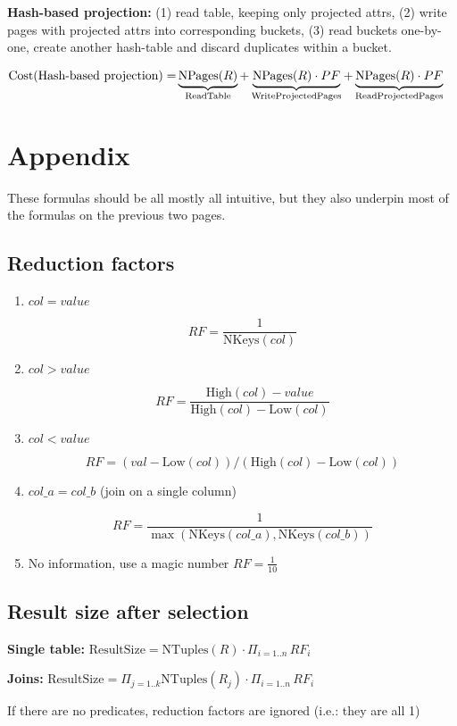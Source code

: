 \documentclass[10pt]{article}
\newcommand{\High}{\mathrm{High}}
\newcommand{\Low}{\mathrm{Low}}
\newcommand{\NKeys}{\mathrm{NKeys}}
\newcommand{\NPages}{\mathrm{NPages}}
\newcommand{\NTuples}{\mathrm{NTuples}}
\begin{document}
\textbf{Hash-based projection: } (1) read table, keeping only projected attrs, (2) write pages with projected attrs into corresponding buckets, (3) read buckets one-by-one, create another hash-table and discard duplicates within a bucket.

\begin{greenbox}
\begin{align*}
\text{Cost(Hash-based projection)} = &\underbrace{\NPages(R)}_{\tiny \text{ReadTable}} + \underbrace{\NPages(R)\cdot PF}_{\text{WriteProjectedPages}} + \underbrace{ \NPages(R) \cdot PF }_{ \text{ReadProjectedPages}}
\end{align*}
\end{greenbox}

\newpage

\section{Appendix}

These formulas should be all mostly all intuitive, but they also underpin most of the formulas on the previous two pages.

\subsection{Reduction factors}

\begin{enumerate}

\item $col = value$

$$
RF = \frac{1}{\NKeys(col)}
$$

\item $col > value$

$$
RF = \frac{\High(col) - value}{\High(col) - \Low(col)}
$$

\item $col < value$

$$
RF = (val - \Low(col)) / (\High(col) - \Low(col))
$$

\item $col\_a = col\_b$ (join on a single column)

$$
RF = \frac{1}{\max(\NKeys(col\_a), \NKeys(col\_b))}
$$

\item No information, use a magic number $RF = \frac{1}{10}$

\end{enumerate}

\subsection{Result size after selection}

\textbf{Single table: } $\text{ResultSize} = \NTuples(R) \cdot \Pi_{i=1..n} \, RF_i$

\textbf{Joins:} $\text{ResultSize} = \Pi_{j=1..k} \NTuples(R_j) \cdot \Pi_{i=1..n} \, RF_i$

If there are no predicates, reduction factors are ignored (i.e.: they are all 1)
\end{document}
